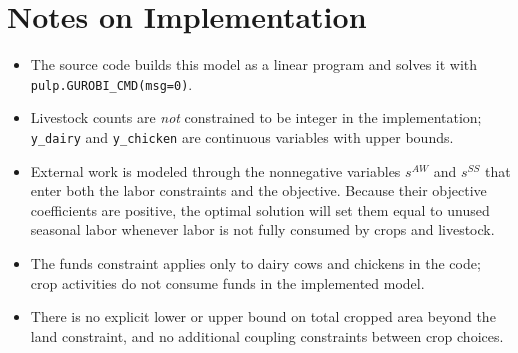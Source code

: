 \section*{Notes on Implementation}

\begin{itemize}
    \item The source code builds this model as a linear program and solves it with \texttt{pulp.GUROBI\_CMD(msg=0)}.
    \item Livestock counts are \emph{not} constrained to be integer in the implementation; \texttt{y\_dairy} and \texttt{y\_chicken} are continuous variables with upper bounds.
    \item External work is modeled through the nonnegative variables $s^{AW}$ and $s^{SS}$ that enter both the labor constraints and the objective. Because their objective coefficients are positive, the optimal solution will set them equal to unused seasonal labor whenever labor is not fully consumed by crops and livestock.
    \item The funds constraint applies only to dairy cows and chickens in the code; crop activities do not consume funds in the implemented model.
    \item There is no explicit lower or upper bound on total cropped area beyond the land constraint, and no additional coupling constraints between crop choices.
\end{itemize}
